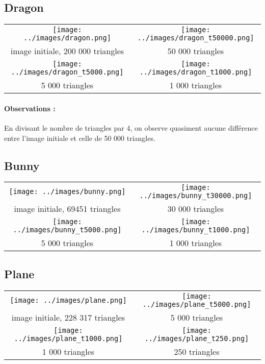 \documentclass[11pt,a4paper]{article}
\begin{document}
\subsection{Dragon}
\begin{tabular}{|c|c|}
\hline
 \texttt{[image: ../images/dragon.png]} & \texttt{[image: ../images/dragon\_t50000.png]} \\
image initiale, 200 000 triangles   &  50 000 triangles \\
\hline
\texttt{[image: ../images/dragon\_t5000.png]} & \texttt{[image: ../images/dragon\_t1000.png]} \\
5 000 triangles  &  1 000 triangles   \\
\hline
\end{tabular}

\paragraph{Observations :}
En divisant le nombre de triangles par 4, on observe quasiment aucune différence entre l'image initiale et celle 
de 50 000 triangles.

\subsection{Bunny}
 \begin{tabular}{|c|c|}
\hline
 \texttt{[image: ../images/bunny.png]} & \texttt{[image: ../images/bunny\_t30000.png]} \\
image initiale, 69451 triangles   &  30 000 triangles \\
\hline
 \texttt{[image: ../images/bunny\_t5000.png]} & \texttt{[image: ../images/bunny\_t1000.png]} \\
5 000 triangles  &  1 000 triangles   \\
\hline
 \end{tabular}

\subsection{Plane}
\begin{tabular}{|c|c|}
\hline
 \texttt{[image: ../images/plane.png]} & \texttt{[image: ../images/plane\_t5000.png]} \\
image initiale, 228 317 triangles   &  5 000 triangles \\
\hline
\texttt{[image: ../images/plane\_t1000.png]} & \texttt{[image: ../images/plane\_t250.png]} \\
1 000 triangles  &  250 triangles   \\
\hline
\end{tabular}
\end{document}
